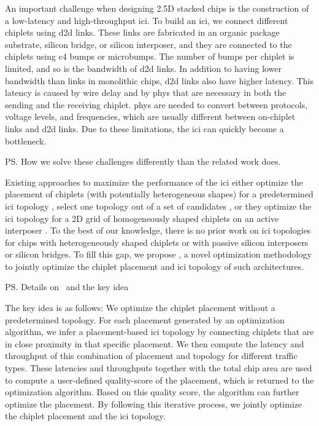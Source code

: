 An important challenge when designing 2.5D stacked chips is the construction of a low-latency and high-throughput \gls{ici}. 
To build an \gls{ici}, we connect different chiplets using \gls{d2d} links.
These links are fabricated in an organic package substrate, silicon bridge, or silicon interposer, and they are connected to the chiplets using \gls{c4} bumps or microbumps.
The number of bumps per chiplet is limited, and so is the bandwidth of \gls{d2d} links.
In addition to having lower bandwidth than links in monolithic chips, \gls{d2d} links also have higher latency.
This latency is caused by wire delay and by \gls{phys} that are necessary in both the sending and the receiving chiplet.
\gls{phys} are needed to convert between protocols, voltage levels, and frequencies, which are usually different between on-chiplet links and \gls{d2d} links.
Due to these limitations, the \gls{ici} can quickly become a bottleneck.

\ps{How we solve these challenges differently than the related work does.}

Existing approaches to maximize the performance of the \gls{ici} either optimize the placement of chiplets (with potentially heterogeneous shapes) for a predetermined \gls{ici} topology 
\cite{ho,liu,seemuth,eris,osmolovskyi,tap25d,chiou}, select one topology out of a set of candidates \cite{coskun-1, coskun-2}, or they optimize the \gls{ici} topology for a 2D grid of homogeneously shaped chiplets on an active interposer \cite{butterdonut, cluscross, kite}.
To the best of our knowledge, there is no prior work on \gls{ici} topologies for chips with heterogeneously shaped chiplets or with passive silicon interposers or silicon bridges.
To fill this gap, we propose \name, a novel optimization methodology to jointly optimize the chiplet placement and \gls{ici} topology of such architectures.
\ifnb
\else
\newpage
\fi

\ps{Details on \name~and the key idea}

The key idea is as follows: 
We optimize the chiplet placement without a predetermined topology.
For each placement generated by an optimization algorithm, we infer a placement-based \gls{ici} topology by connecting chiplets that are in close proximity in that specific placement.
We then compute the latency and throughput of this combination of placement and topology for different traffic types.
These latencies and throughputs together with the total chip area are used to compute a user-defined quality-score of the placement, which is returned to the optimization algorithm.
Based on this quality score, the algorithm can further optimize the placement.
By following this iterative process, we jointly optimize the chiplet placement and the \gls{ici} topology.

